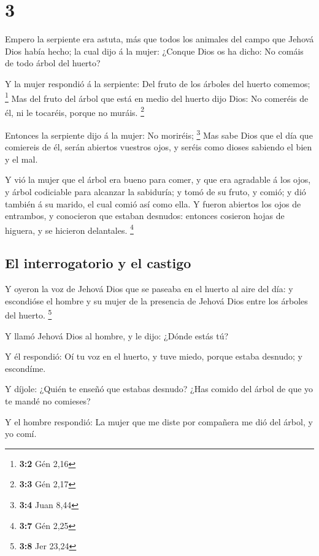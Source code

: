 \hypertarget{section-2}{%
\section{3}\label{section-2}}

 Empero la serpiente era astuta, más que todos los
animales del campo que Jehová Dios había hecho; la cual dijo á la mujer:
¿Conque Dios os ha dicho: No comáis de todo árbol del huerto?

 Y la mujer respondió á la serpiente: Del fruto de los
árboles del huerto comemos; \footnote{\textbf{3:2} Gén 2,16}
 Mas del fruto del árbol que está en medio del huerto dijo
Dios: No comeréis de él, ni le tocaréis, porque no muráis. \footnote{\textbf{3:3}
  Gén 2,17}

 Entonces la serpiente dijo á la mujer: No moriréis;
\footnote{\textbf{3:4} Juan 8,44}  Mas sabe Dios que el
día que comiereis de él, serán abiertos vuestros ojos, y seréis como
dioses sabiendo el bien y el mal.

 Y vió la mujer que el árbol era bueno para comer, y que
era agradable á los ojos, y árbol codiciable para alcanzar la sabiduría;
y tomó de su fruto, y comió; y dió también á su marido, el cual comió
así como ella.  Y fueron abiertos los ojos de entrambos, y
conocieron que estaban desnudos: entonces cosieron hojas de higuera, y
se hicieron delantales. \footnote{\textbf{3:7} Gén 2,25}

\hypertarget{el-interrogatorio-y-el-castigo}{%
\subsection{El interrogatorio y el
castigo}\label{el-interrogatorio-y-el-castigo}}

 Y oyeron la voz de Jehová Dios que se paseaba en el
huerto al aire del día: y escondióse el hombre y su mujer de la
presencia de Jehová Dios entre los árboles del huerto. \footnote{\textbf{3:8}
  Jer 23,24}

 Y llamó Jehová Dios al hombre, y le dijo: ¿Dónde estás
tú?

 Y él respondió: Oí tu voz en el huerto, y tuve miedo,
porque estaba desnudo; y escondíme.

 Y díjole: ¿Quién te enseñó que estabas desnudo? ¿Has
comido del árbol de que yo te mandé no comieses?

 Y el hombre respondió: La mujer que me diste por
compañera me dió del árbol, y yo comí.

